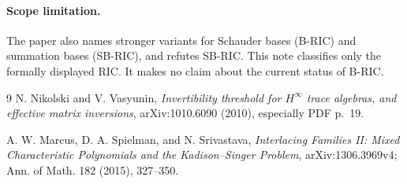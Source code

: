 \documentclass[10pt]{article}
\begin{document}
\paragraph{Scope limitation.}
The paper also names stronger variants for Schauder bases (B-RIC) and
summation bases (SB-RIC), and refutes SB-RIC.  This note classifies only the
formally displayed RIC.  It makes no claim about the current status of B-RIC.

\begin{thebibliography}{9}
N. Nikolski and V. Vasyunin,
\emph{Invertibility threshold for $H^\infty$ trace algebras, and effective
matrix inversions}, arXiv:1010.6090 (2010), especially PDF p.~19.

A. W. Marcus, D. A. Spielman, and N. Srivastava,
\emph{Interlacing Families II: Mixed Characteristic Polynomials and the
Kadison--Singer Problem}, arXiv:1306.3969v4; Ann. of Math. 182 (2015),
327--350.
\end{thebibliography}
\end{document}
